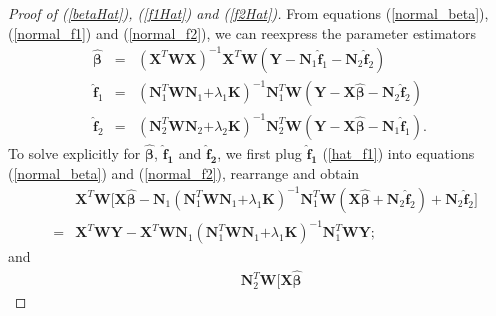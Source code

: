 \documentclass[review]{elsarticle}
\begin{document}
%
%
\begin{proof} [Proof of (\ref{betaHat}),  (\ref{f1Hat}) and  (\ref{f2Hat})]
From equations (\ref{normal_beta}), (\ref{normal_f1}) and (\ref{normal_f2}), we can reexpress the parameter estimators
\begin{eqnarray} 
\boldsymbol {\hat \beta}
&=&
(\boldsymbol X^T  \boldsymbol W\boldsymbol X)^{-1}  
\boldsymbol X^T  \boldsymbol W (\boldsymbol Y
- \boldsymbol N_1 \boldsymbol {\hat f}_1
- \boldsymbol N_2 \boldsymbol {\hat f}_2)
\nonumber
\\
\boldsymbol {\hat f}_1 
&=&
(\boldsymbol N_1^T  \boldsymbol W \boldsymbol N_1 \boldsymbol 
+ \lambda_1 \boldsymbol K)^{-1}
\boldsymbol N_1^T  \boldsymbol W
( \boldsymbol Y 
- \boldsymbol X \boldsymbol {\hat \beta}
-   \boldsymbol N_2 \boldsymbol {\hat f}_2) 
\label{hat_f1}\\ 
\boldsymbol {\hat f}_2 
&=& (\boldsymbol N_2^T  \boldsymbol W \boldsymbol N_2 \boldsymbol 
+ \lambda_2 \boldsymbol K)^{-1}
\boldsymbol N_2^T  \boldsymbol W (\boldsymbol Y -\boldsymbol X \boldsymbol {\hat \beta}
-  \boldsymbol N_1 \boldsymbol {\hat f}_1).  \label{hat_f2}
\end{eqnarray}
To solve explicitly for $\boldsymbol {\hat \beta}$, $\boldsymbol {\hat f_1}$ and $\boldsymbol {\hat f_2}$, we first plug $ \boldsymbol {\hat f_1}$ (\ref{hat_f1}) into equations (\ref{normal_beta}) and  (\ref{normal_f2}), rearrange and obtain 
\begin{eqnarray*} 
&&
\boldsymbol X^T  \boldsymbol W
\big[
\boldsymbol X \boldsymbol {\hat \beta} 
- 
\boldsymbol N_1 
 (\boldsymbol N_1^T  \boldsymbol W \boldsymbol N_1 \boldsymbol 
 + \lambda_1 \boldsymbol K)^{-1}
 \boldsymbol N_1^T  \boldsymbol W
  (\boldsymbol X \boldsymbol {\hat \beta} + \boldsymbol N_2 \boldsymbol {\hat f}_2)
+  \boldsymbol N_2 \boldsymbol {\hat f}_2
\big] \\
&=&
  \boldsymbol X^T  \boldsymbol W \boldsymbol Y
  - \boldsymbol X^T  \boldsymbol W
  \boldsymbol N_1 
 (\boldsymbol N_1^T  \boldsymbol W \boldsymbol N_1 \boldsymbol 
 + \lambda_1 \boldsymbol K)^{-1}
 \boldsymbol N_1^T  \boldsymbol W \boldsymbol Y;
\end{eqnarray*}
and
\begin{eqnarray*} 
&&
\boldsymbol N_2^T  \boldsymbol W
\big[
\boldsymbol X \boldsymbol {\hat \beta} 

\end{eqnarray*}
\end{proof}
\end{document}
